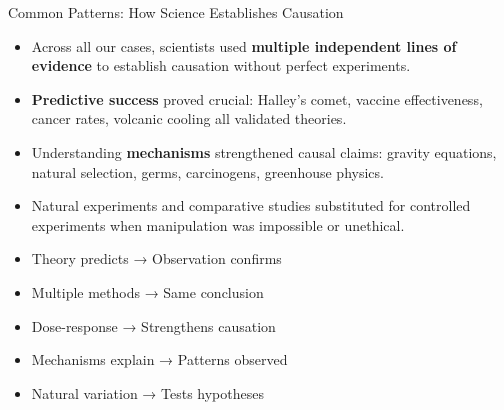 \documentclass{beamer}
\begin{document}
	\begin{frame}{Common Patterns: How Science Establishes Causation}
		\begin{itemize}
			\item Across all our cases, scientists used \textbf{multiple independent lines of evidence} to establish causation without perfect experiments.
			\item \textbf{Predictive success} proved crucial: Halley's comet, vaccine effectiveness, cancer rates, volcanic cooling all validated theories.
			\item Understanding \textbf{mechanisms} strengthened causal claims: gravity equations, natural selection, germs, carcinogens, greenhouse physics.
			\item Natural experiments and comparative studies substituted for controlled experiments when manipulation was impossible or unethical.
		\end{itemize}
		
		\begin{example}
			\begin{itemize}
				\item Theory predicts → Observation confirms
				\item Multiple methods → Same conclusion
				\item Dose-response → Strengthens causation
				\item Mechanisms explain → Patterns observed
				\item Natural variation → Tests hypotheses
			\end{itemize}
		\end{example}
	\end{frame}
	
\end{document}
